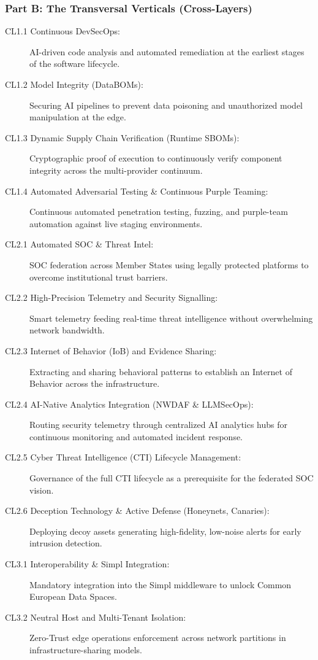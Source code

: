 \documentclass[12pt,a4paper]{report}
\begin{document}
\subsubsection{Part B: The Transversal Verticals (Cross-Layers)}
\begin{description}
    \item[CL1.1 Continuous DevSecOps:] AI-driven code analysis and automated remediation at the earliest stages of the software lifecycle.
    \item[CL1.2 Model Integrity (DataBOMs):] Securing AI pipelines to prevent data poisoning and unauthorized model manipulation at the edge.
    \item[CL1.3 Dynamic Supply Chain Verification (Runtime SBOMs):] Cryptographic proof of execution to continuously verify component integrity across the multi-provider continuum.
    \item[CL1.4 Automated Adversarial Testing \& Continuous Purple Teaming:] Continuous automated penetration testing, fuzzing, and purple-team automation against live staging environments.
    \item[CL2.1 Automated SOC \& Threat Intel:] SOC federation across Member States using legally protected platforms to overcome institutional trust barriers.
    \item[CL2.2 High-Precision Telemetry and Security Signalling:] Smart telemetry feeding real-time threat intelligence without overwhelming network bandwidth.
    \item[CL2.3 Internet of Behavior (IoB) and Evidence Sharing:] Extracting and sharing behavioral patterns to establish an Internet of Behavior across the infrastructure.
    \item[CL2.4 AI-Native Analytics Integration (NWDAF \& LLMSecOps):] Routing security telemetry through centralized AI analytics hubs for continuous monitoring and automated incident response.
    \item[CL2.5 Cyber Threat Intelligence (CTI) Lifecycle Management:] Governance of the full CTI lifecycle as a prerequisite for the federated SOC vision.
    \item[CL2.6 Deception Technology \& Active Defense (Honeynets, Canaries):] Deploying decoy assets generating high-fidelity, low-noise alerts for early intrusion detection.
    \item[CL3.1 Interoperability \& Simpl Integration:] Mandatory integration into the Simpl middleware to unlock Common European Data Spaces.
    \item[CL3.2 Neutral Host and Multi-Tenant Isolation:] Zero-Trust edge operations enforcement across network partitions in infrastructure-sharing models.

\end{description}
\end{document}
